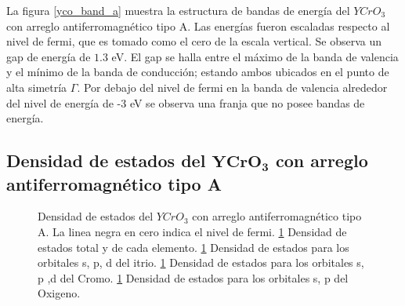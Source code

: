 La figura \ref{yco_band_a} muestra la estructura de bandas de energ\'ia del 
$YCrO_{3}$ con arreglo antiferromagn\'etico tipo A. Las energ\'ias 
fueron escaladas 
respecto al nivel de fermi, que es tomado como el cero de la escala 
vertical. Se observa un gap de 
energ\'ia de $1.3$ eV. El 
gap se halla entre el m\'aximo de la banda de valencia y el m\'inimo de la 
banda de conducci\'on; estando ambos ubicados en el punto de alta simetr\'ia 
$\Gamma$. Por debajo del nivel de fermi en la banda de valencia 
alrededor del nivel de energ\'ia de -3 eV se observa una franja que no 
posee bandas de energ\'ia. 

\subsection{Densidad de estados del $\mathbf{YCrO_{3}}$ con arreglo      
    antiferromagn\'etico tipo A}


\begin{figure}
    \centering
    
    \singlespace
    \caption[Densidad de estados del $YCrO_{3}$ con arreglo 
    antiferromagn\'etico tipo A]{Densidad de estados del $YCrO_{3}$ 
    con arreglo 
        antiferromagn\'etico tipo A. La linea negra en cero indica el 
        nivel de 
        fermi. \ref{yco_dos_a}  Densidad de estados total y 
        de cada elemento. \ref{yco_dos_a}  
        Densidad de 
        estados para los orbitales s, p, d del itrio. \ref{yco_dos_a} 
         Densidad de 
        estados para 
        los orbitales s, p ,d del Cromo. \ref{yco_dos_a}  
        Densidad de estados para 
        los orbitales 
        s, p del Oxigeno.}
    \label{yco_dos_a}
\end{figure}

